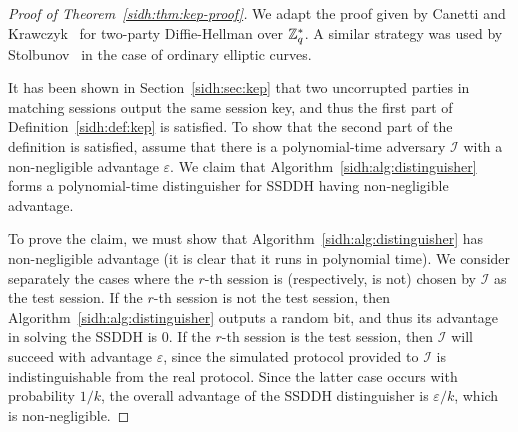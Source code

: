 \begin{proof}[Proof of Theorem~\ref{sidh:thm:kep-proof}]
We adapt the proof given by Canetti and Krawczyk~\cite[\S
  5.1]{canetti} for two-party Diffie-Hellman over ${\mathbb{Z}}_q^*$. A similar
strategy was used by Stolbunov~\cite{stolbunov-red} in the case of
ordinary elliptic curves.

It has been shown in Section~\ref{sidh:sec:kep} that two uncorrupted
parties in matching sessions output the same session key, and thus the
first part of Definition~\ref{sidh:def:kep} is satisfied. To show that the
second part of the definition is satisfied, assume that there is a
polynomial-time adversary $\mathcal{I}$ with a non-negligible advantage
$\varepsilon$. We claim that Algorithm~\ref{sidh:alg:distinguisher} forms a
polynomial-time distinguisher for SSDDH having non-negligible
advantage.

To prove the claim, we must show that
Algorithm~\ref{sidh:alg:distinguisher} has non-negligible advantage (it is
clear that it runs in polynomial time). We consider separately the
cases where the $r$-th session is (respectively, is not) chosen by
$\mathcal{I}$ as the test session. If the $r$-th session is not the
test session, then Algorithm~\ref{sidh:alg:distinguisher} outputs a random
bit, and thus its advantage in solving the SSDDH is $0$. If the
$r$-th session is the test session, then $\mathcal{I}$ will succeed
with advantage $\varepsilon$, since the simulated protocol provided to
$\mathcal{I}$ is indistinguishable from the real protocol. Since the
latter case occurs with probability $1/k$, the overall advantage of
the SSDDH distinguisher is $\varepsilon/k$, which is non-negligible.
\end{proof}

